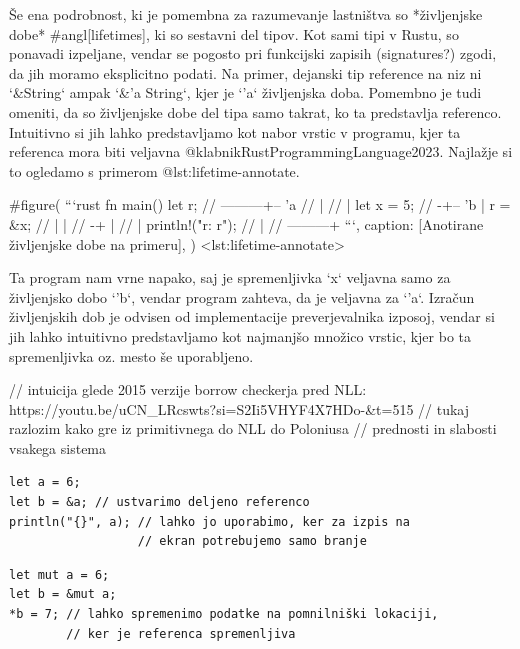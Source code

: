 \documentclass[a4paper,12pt,openright]{book}
\begin{document}
Še ena podrobnost, ki je pomembna za razumevanje lastništva so *življenjske dobe* #angl[lifetimes], ki so sestavni del tipov. Kot sami tipi v Rustu, so ponavadi izpeljane, vendar se pogosto pri funkcijski zapisih (signatures?) zgodi, da jih moramo eksplicitno podati. Na primer, dejanski tip reference na niz ni `&String` ampak `&'a String`, kjer je `'a` življenjska doba. Pomembno je tudi omeniti, da so življenjske dobe del tipa samo takrat, ko ta predstavlja referenco. Intuitivno si jih lahko predstavljamo kot nabor vrstic v programu, kjer ta referenca mora biti veljavna @klabnikRustProgrammingLanguage2023. Najlažje si to ogledamo s primerom @lst:lifetime-annotate.

#figure(
  ```rust
  fn main() {
      let r;                // ---------+-- 'a
                            //          |
      {                     //          |
          let x = 5;        // -+-- 'b  |
          r = &x;           //  |       |
      }                     // -+       |
                            //          |
      println!("r: {r}");   //          |
  }                         // ---------+ 
  ```,
  caption: [Anotirane življenjske dobe na primeru],
) <lst:lifetime-annotate>

Ta program nam vrne napako, saj je spremenljivka `x` veljavna samo za življenjsko dobo `'b`, vendar program zahteva, da je veljavna za `'a`. Izračun življenjskih dob je odvisen od implementacije preverjevalnika izposoj, vendar si jih lahko intuitivno predstavljamo kot najmanjšo množico vrstic, kjer bo ta spremenljivka oz. mesto še uporabljeno.

// intuicija glede 2015 verzije borrow checkerja pred NLL: https://youtu.be/uCN_LRcswts?si=S2Ii5VHYF4X7HDo-&t=515
// tukaj razlozim kako gre iz primitivnega do NLL do Poloniusa
// prednosti in slabosti vsakega sistema

\begin{listing}[!ht]
	\begin{verbatim}
let a = 6;
let b = &a; // ustvarimo deljeno referenco
println("{}", a); // lahko jo uporabimo, ker za izpis na 
                  // ekran potrebujemo samo branje
\end{verbatim}
	\caption{Pravilna uporaba deljene reference}
	\label{lst:uporabadeljena}
\end{listing}

\begin{listing}[!ht]
	\begin{verbatim}
let mut a = 6;
let b = &mut a;
*b = 7; // lahko spremenimo podatke na pomnilniški lokaciji, 
        // ker je referenca spremenljiva
\end{verbatim}
	\caption{Pravilna uporaba spremenljive reference}
	\label{lst:uporabaspremenljiva}
\end{listing}
\end{document}
